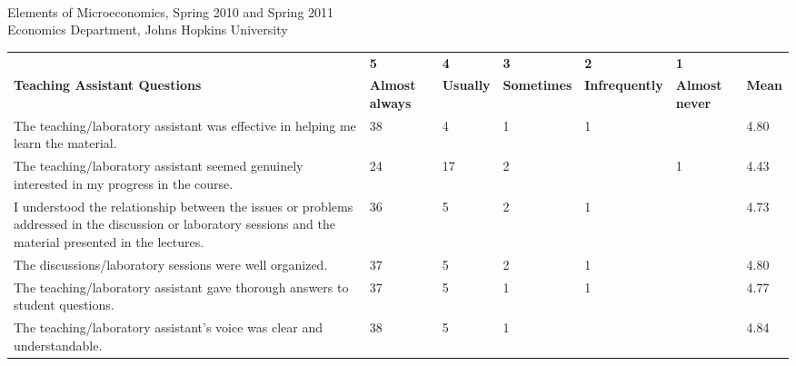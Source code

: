 \documentclass[11pt]{article}
\newcommand{\tn}{\tabularnewline}
\begin{document}
\vspace{.5in}
\\		
\noindent Elements of Microeconomics, Spring 2010 and Spring 2011\\				
Economics Department, Johns Hopkins University\\
{\scriptsize{
\begin{tabular}{|p{2.5in}|x{.6in}|x{.6in}|x{.6in}|x{.6in}|x{.6in}|x{.6in}|}
\hline					
&{\bf 5} & {\bf 4} & {\bf 3} & {\bf 2} & {\bf 1}&	\tn
{\bf Teaching Assistant Questions}&	{\bf Almost always}&	{\bf Usually}&	{\bf Sometimes}&	{\bf Infrequently}&	{\bf Almost never}&	{\bf Mean}\tn
\hline
\hline
The teaching/laboratory assistant was effective in helping me learn the material.&	38&	4&	1&	1&	&	4.80\tn\hline
The teaching/laboratory assistant seemed genuinely interested in my progress in the course.&	24&	17&	2&	&	1&	4.43\tn\hline
I understood the relationship between the issues or problems addressed in the discussion or laboratory sessions and the material presented in the lectures.&	36&	5&	2&	1&	&	4.73\tn\hline
The discussions/laboratory sessions were well organized.&	37&	5&	2&	1&	&	4.80\tn\hline
The teaching/laboratory assistant gave thorough answers to student questions.&	37&	5&	1&	1&	&	4.77\tn\hline
The teaching/laboratory assistant's voice was clear and understandable.&	38&	5&	1&	&	&	4.84\tn\hline
\end{tabular}
}}
\vspace{.1in}

\end{document}
